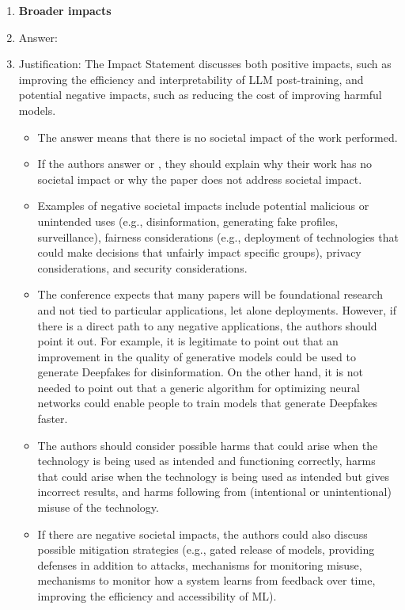 \documentclass{article}
\begin{document}
\begin{enumerate}
    
\item {\bf Broader impacts}
    \item[] Answer: \answerYes{}
    \item[] Justification: The Impact Statement discusses both positive impacts, such as improving the efficiency and interpretability of LLM post-training, and potential negative impacts, such as reducing the cost of improving harmful models.
    \begin{itemize}
        \item The answer \answerNA{} means that there is no societal impact of the work performed.
        \item If the authors answer \answerNA{} or \answerNo, they should explain why their work has no societal impact or why the paper does not address societal impact.
        \item Examples of negative societal impacts include potential malicious or unintended uses (e.g., disinformation, generating fake profiles, surveillance), fairness considerations (e.g., deployment of technologies that could make decisions that unfairly impact specific groups), privacy considerations, and security considerations.
        \item The conference expects that many papers will be foundational research and not tied to particular applications, let alone deployments. However, if there is a direct path to any negative applications, the authors should point it out. For example, it is legitimate to point out that an improvement in the quality of generative models could be used to generate Deepfakes for disinformation. On the other hand, it is not needed to point out that a generic algorithm for optimizing neural networks could enable people to train models that generate Deepfakes faster.
        \item The authors should consider possible harms that could arise when the technology is being used as intended and functioning correctly, harms that could arise when the technology is being used as intended but gives incorrect results, and harms following from (intentional or unintentional) misuse of the technology.
        \item If there are negative societal impacts, the authors could also discuss possible mitigation strategies (e.g., gated release of models, providing defenses in addition to attacks, mechanisms for monitoring misuse, mechanisms to monitor how a system learns from feedback over time, improving the efficiency and accessibility of ML).
    \end{itemize}


\end{enumerate}
\end{document}
